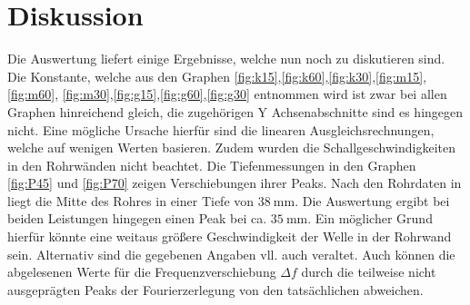 
\section{Diskussion}
\label{sec:Diskussion}
Die Auswertung liefert einige Ergebnisse, welche nun noch zu diskutieren sind.
Die Konstante, welche aus den Graphen \ref{fig:k15},\ref{fig:k60},\ref{fig:k30},\ref{fig:m15},\ref{fig:m60},
\ref{fig:m30},\ref{fig:g15},\ref{fig:g60},\ref{fig:g30} entnommen wird ist zwar
bei allen Graphen hinreichend gleich, die zugehörigen Y Achsenabschnitte sind es
hingegen nicht. Eine mögliche Ursache hierfür sind die linearen Ausgleichsrechnungen,
welche auf wenigen Werten basieren. Zudem wurden die Schallgeschwindigkeiten in
den Rohrwänden nicht beachtet. Die Tiefenmessungen in den Graphen \ref{fig:P45} und
\ref{fig:P70} zeigen Verschiebungen ihrer Peaks. Nach den Rohrdaten in \cite{US3}
 liegt die Mitte des Rohres in einer Tiefe von $\SI{38}{\milli\meter}$. Die Auswertung ergibt bei beiden
  Leistungen hingegen einen Peak bei ca. $\SI{35}{\milli\meter}$. Ein möglicher Grund
  hierfür könnte eine weitaus größere Geschwindigkeit der Welle in der Rohrwand sein.
  Alternativ sind die gegebenen Angaben vll. auch veraltet.
Auch können die abgelesenen Werte für die Frequenzverschiebung $\Delta f$ durch
die teilweise nicht ausgeprägten Peaks der Fourierzerlegung von den tatsächlichen abweichen.





